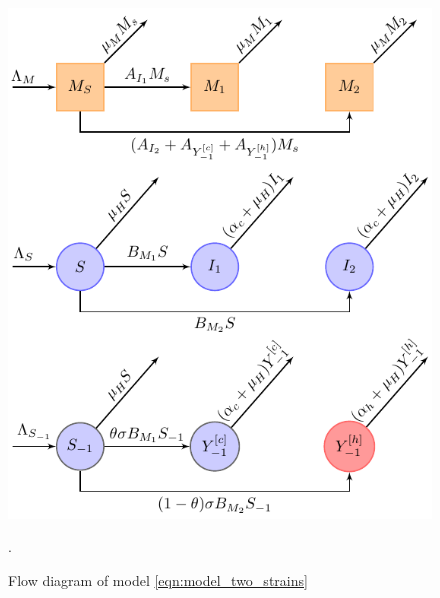 \begin{figure}[htb]
	\centering
	\includegraphics[width=\linewidth]{disiase_flow.pdf}
	\caption{Flow diagram of model \eqref{eqn:model_two_strains}}.
	\label{fig:disiaseflow}
\end{figure}
%
